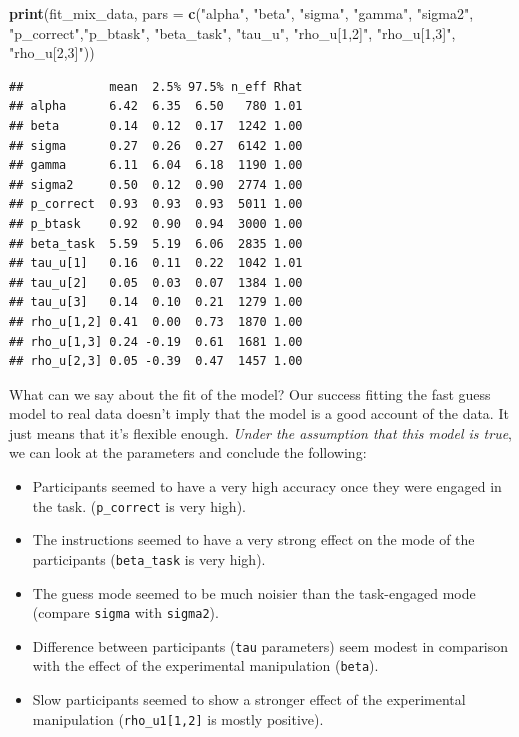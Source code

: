 \documentclass[12pt,]{krantz}
\newenvironment{Shaded}{\begin{snugshade}}{\end{snugshade}}
\newcommand{\KeywordTok}[1]{\textcolor[rgb]{0.13,0.29,0.53}{\textbf{#1}}}
\newcommand{\DataTypeTok}[1]{\textcolor[rgb]{0.13,0.29,0.53}{#1}}
\newcommand{\StringTok}[1]{\textcolor[rgb]{0.31,0.60,0.02}{#1}}
\newcommand{\NormalTok}[1]{#1}
\providecommand{\tightlist}{%
  \setlength{\itemsep}{0pt}\setlength{\parskip}{0pt}}
\theoremstyle{definition}
\theoremstyle{definition}
\theoremstyle{definition}
\theoremstyle{remark}
\begin{document}
\begin{Shaded}
\begin{Highlighting}[]
\KeywordTok{print}\NormalTok{(fit_mix_data, }\DataTypeTok{pars =} \KeywordTok{c}\NormalTok{(}\StringTok{"alpha"}\NormalTok{, }\StringTok{"beta"}\NormalTok{, }\StringTok{"sigma"}\NormalTok{, }\StringTok{"gamma"}\NormalTok{, }\StringTok{"sigma2"}\NormalTok{,}
                              \StringTok{"p_correct"}\NormalTok{,}\StringTok{"p_btask"}\NormalTok{, }\StringTok{"beta_task"}\NormalTok{, }\StringTok{"tau_u"}\NormalTok{,}
                              \StringTok{"rho_u[1,2]"}\NormalTok{, }\StringTok{"rho_u[1,3]"}\NormalTok{, }\StringTok{"rho_u[2,3]"}\NormalTok{))}
\end{Highlighting}
\end{Shaded}

\begin{verbatim}
##            mean  2.5% 97.5% n_eff Rhat
## alpha      6.42  6.35  6.50   780 1.01
## beta       0.14  0.12  0.17  1242 1.00
## sigma      0.27  0.26  0.27  6142 1.00
## gamma      6.11  6.04  6.18  1190 1.00
## sigma2     0.50  0.12  0.90  2774 1.00
## p_correct  0.93  0.93  0.93  5011 1.00
## p_btask    0.92  0.90  0.94  3000 1.00
## beta_task  5.59  5.19  6.06  2835 1.00
## tau_u[1]   0.16  0.11  0.22  1042 1.01
## tau_u[2]   0.05  0.03  0.07  1384 1.00
## tau_u[3]   0.14  0.10  0.21  1279 1.00
## rho_u[1,2] 0.41  0.00  0.73  1870 1.00
## rho_u[1,3] 0.24 -0.19  0.61  1681 1.00
## rho_u[2,3] 0.05 -0.39  0.47  1457 1.00
\end{verbatim}

What can we say about the fit of the model? Our success fitting the fast
guess model to real data doesn't imply that the model is a good account
of the data. It just means that it's flexible enough. \emph{Under the
assumption that this model is true}, we can look at the parameters and
conclude the following:

\begin{itemize}
\tightlist
\item
  Participants seemed to have a very high accuracy once they were
  engaged in the task. (\texttt{p\_correct} is very high).
\item
  The instructions seemed to have a very strong effect on the mode of
  the participants (\texttt{beta\_task} is very high).
\item
  The guess mode seemed to be much noisier than the task-engaged mode
  (compare \texttt{sigma} with \texttt{sigma2}).
\item
  Difference between participants (\texttt{tau} parameters) seem modest
  in comparison with the effect of the experimental manipulation
  (\texttt{beta}).
\item
  Slow participants seemed to show a stronger effect of the experimental
  manipulation (\texttt{rho\_u1{[}1,2{]}} is mostly positive).
\end{itemize}
\end{document}
